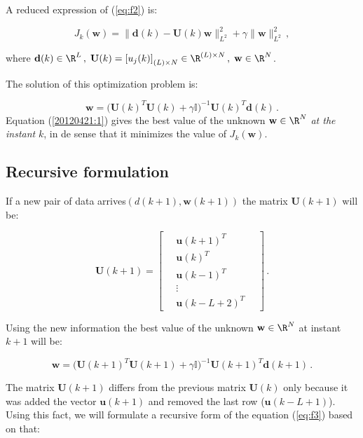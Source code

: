 A reduced expression of (\ref{eq:f2}) is:

\begin{equation}
J_k(\mathbf{w})
= \big\|\mathbf{d}(k)-\mathbf{U}(k)\mathbf{w} \big\|_{L^2}^2 + \gamma \big\| \mathbf{w} \big\|_{L^2}^2 \,,
\end{equation}

where $\mathbf{d}(k)\in\R^{L}\,,\;
\mathbf{U}(k)=\left[ u_j(k) \right]_{(L)\times N}\in\R^{(L)\times N}\,,\;
\mathbf{w}\in\R^{N}$.


The solution of this optimization problem is:

\begin{equation}\label{20120421:1}
\mathbf{w} = \big(\mathbf{U}(k)^T\mathbf{U}(k) + \gamma \mathbb{I} \big)^{-1}\mathbf{U}(k)^T\mathbf{d}(k)\,.
\end{equation}
Equation (\ref{20120421:1}) gives the best value of the unknown
$\mathbf{w}\in\R^N$ {\em at the instant\/} $k$, in de sense that it
minimizes the value of $J_k(\mathbf{w})$.

\subsection{Recursive formulation}


If a new pair of data arrives$(d(k+1),\mathbf{w}(k+1))$ the matrix $\mathbf{U}(k+1)$ will be:

\begin{equation}
\mathbf{U}(k+1)=
\begin{bmatrix}
\, & \mathbf{u}(k+1)^T & \, \\
\, & \mathbf{u}(k)^T & \, \\
\, & \mathbf{u}(k-1)^T & \, \\
\,  & \vdots & \, \\
\, & \mathbf{u}(k-L+2)^T & \,
\end{bmatrix}\, .
\end{equation}

Using the new information the best value of the
unknown $\mathbf{w}\in\R^N$ at instant $k+1$ will be:

\begin{equation}\label{eq:f3}
\mathbf{w} = \big(\mathbf{U}(k+1)^T\mathbf{U}(k+1) + 
\gamma \mathbb{I} \big)^{-1}\mathbf{U}(k+1)^T\mathbf{d}(k+1)\,.
\end{equation}

The matrix $\mathbf{U}(k+1)$ differs from the previous matrix 
$\mathbf{U}(k)$ only because it was added the vector 
$\mathbf{u}(k+1)$ and removed the last row ($\mathbf{u}(k-L+1)$).
Using this fact, we will formulate a recursive form of the equation 
(\ref{eq:f3}) based on that:

